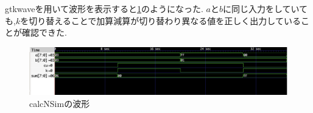 \documentclass[autodetect-engine, dvi=dvipdfmx, 10pt, a4paper, ja=standard]{bxjsarticle}
\begin{document}
gtkwaveを用いて波形を表示すると\ref{fig:ex7}のようになった.
$a$と$b$に同じ入力をしていても,$k$を切り替えることで加算減算が切り替わり異なる値を正しく出力していることが確認できた.

\begin{figure}[H]
	\centering
	\includegraphics[width=\textwidth]{ex7-wave.png}
	\caption{calcNSimの波形}
	\label{fig:ex7}
\end{figure}

\end{document}
